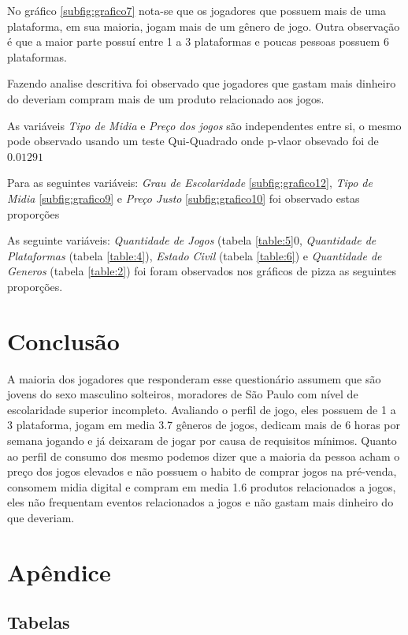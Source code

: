\documentclass[11pt,a4paper]{article}
\begin{document}
No gráfico \ref{subfig:grafico7} nota-se que os jogadores que possuem mais de uma plataforma, em sua maioria, jogam mais de um gênero de jogo. Outra observação é que a maior parte possuí entre 1 a 3 plataformas e poucas pessoas possuem 6 plataformas.

Fazendo analise descritiva foi observado que jogadores que gastam mais dinheiro do deveriam compram mais de um produto relacionado aos jogos.  

As variáveis \textit{Tipo de Midia} e \textit{Preço dos jogos} são independentes entre si, o mesmo pode observado usando um teste Qui-Quadrado onde p-vlaor obsevado foi de $0.01291$

Para as seguintes variáveis: \textit{Grau de Escolaridade } \ref{subfig:grafico12},  \textit{Tipo de Midia} \ref{subfig:grafico9} e \textit{Preço Justo} \ref{subfig:grafico10}  foi observado estas proporções

As seguinte variáveis: \textit{Quantidade de Jogos} (tabela \ref{table:5}0, \textit{Quantidade de Plataformas} (tabela \ref{table:4}), \textit{Estado Civil} (tabela \ref{table:6}) e \textit{Quantidade de Generos} (tabela \ref{table:2}) foi foram observados nos gráficos de pizza as seguintes proporções.
 
 
\section{Conclusão}
\indent
A maioria dos jogadores que responderam esse questionário assumem que são jovens do sexo masculino solteiros, moradores de São Paulo com nível de escolaridade superior incompleto. Avaliando o perfil de jogo, eles possuem de 1 a 3 plataforma, jogam em media 3.7 gêneros de jogos, dedicam mais de 6 horas por semana jogando e já deixaram de jogar por causa de requisitos mínimos. Quanto ao perfil de consumo dos mesmo podemos dizer que a maioria da pessoa acham o preço dos jogos elevados e não possuem o habito de comprar jogos na pré-venda, consomem midia digital e compram em media 1.6 produtos relacionados a jogos, eles não frequentam eventos relacionados a jogos e não gastam mais dinheiro do que deveriam.

\section{Apêndice}
\subsection{Tabelas}
\end{document}
